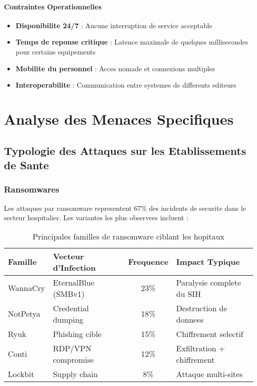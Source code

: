 \paragraph{Contraintes Operationnelles}
\begin{itemize}
    \item \textbf{Disponibilite 24/7} : Aucune interruption de service acceptable
    \item \textbf{Temps de reponse critique} : Latence maximale de quelques millisecondes pour certains equipements
    \item \textbf{Mobilite du personnel} : Acces nomade et connexions multiples
    \item \textbf{Interoperabilite} : Communication entre systemes de differents editeurs
\end{itemize}


\section{Analyse des Menaces Specifiques}

\subsection{Typologie des Attaques sur les Etablissements de Sante}

\subsubsection{Ransomwares}

Les attaques par ransomware representent 67\% des incidents de securite dans le secteur hospitalier. Les variantes les plus observees incluent :

\begin{table}[H]
    \centering
    \caption{Principales familles de ransomware ciblant les hopitaux}
    \begin{tabular}{|l|l|c|l|}
        \hline
        \textbf{Famille} & \textbf{Vecteur d'Infection} & \textbf{Frequence} & \textbf{Impact Typique}    \\
        \hline
        WannaCry         & EternalBlue (SMBv1)          & 23\%               & Paralysie complete du SIH  \\
        \hline
        NotPetya         & Credential dumping           & 18\%               & Destruction de donnees     \\
        \hline
        Ryuk             & Phishing cible               & 15\%               & Chiffrement selectif       \\
        \hline
        Conti            & RDP/VPN compromise           & 12\%               & Exfiltration + chiffrement \\
        \hline
        Lockbit          & Supply chain                 & 8\%                & Attaque multi-sites        \\
        \hline
    \end{tabular}
\end{table}

